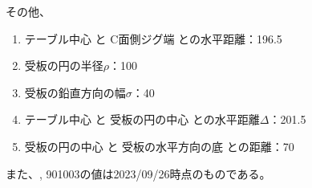 \begin{hosoku}
その他、
\begin{enumerate}
\item テーブル中心 と C面側ジグ端 との水平距離：196.5
\item 受板の円の半径$\rho$：100
\item 受板の鉛直方向の幅$\sigma$：40
\item テーブル中心 と 受板の円の中心 との水平距離$\varDelta$：201.5
\item 受板の円の中心 と 受板の水平方向の底 との距離：70
\end{enumerate}
また、, \ttNum901003の値は2023/09/26時点のものである。
\end{hosoku}



